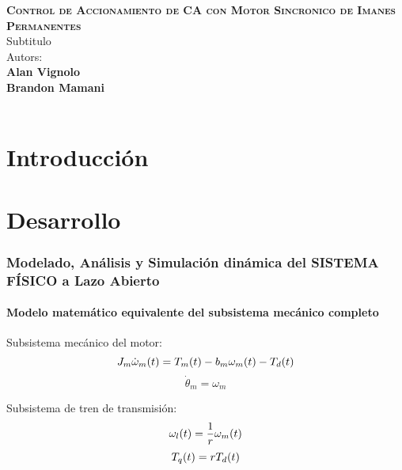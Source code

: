 \documentclass{article}
\begin{document}
\begin{titlepage}
    \centering
    \vspace*{3cm}
    \Huge\textbf{\textsc{Control de Accionamiento de CA con Motor Sincronico de Imanes Permanentes}}\\
    \vspace{1.5cm}
    \large{Subtitulo}\\
    \vspace{10cm}
    \large{Autors:}\\
    \large{\textbf{Alan Vignolo\\Brandon Mamani}}\\
    \vfill
    \the\year\\ %
\end{titlepage}

\part*{Introducción}

\lipsum

\newpage
\part*{Desarrollo}

\section*{Modelado, Análisis y Simulación dinámica del SISTEMA FÍSICO a Lazo Abierto}
\subsection*{Modelo matemático equivalente del subsistema mecánico completo}

Subsistema mecánico del motor:
\begin{equation}
    \label{eq:1.1}
    J_{m}\dot{\omega}_{m}(t) = T_{m}(t)-b_{m}\omega_{m}(t)-T_{d}(t) \\
\end{equation}
\begin{equation}
    \label{eq:1.2}
    \dot{\theta}_{m} = \omega_{m}
\end{equation}

Subsistema de tren de transmisión:
\begin{equation}
    \label{eq:2.1}
    \omega_{l}(t) = \frac{1}{r}\omega_{m}(t) \\
\end{equation}
\begin{equation}
    \label{eq:2.2}
    T_{q}(t) = rT_{d}(t) \\
\end{equation}
\end{document}
